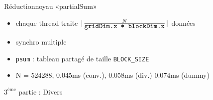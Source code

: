 \documentclass[11pt,mathserif]{beamer}
\begin{document}
\begin{frame}{Réduction}{noyau «partialSum»}
\pause
  
\pause
  \begin{itemize}[<+->]
    \item chaque thread traite $\lfloor \frac{N}{\mbox{{\tt gridDim.x * blockDim.x}}}\rfloor $ données
    \item synchro multiple
    \item {\tt psum} : tableau partagé de taille {\tt BLOCK\_SIZE }
    \item[\faClockO] N = 524288, 0.045ms (conv.), 0.058ms (div.) 0.074ms (dummy)
  \end{itemize}
\end{frame}

\begin{frame}
  \begin{center}
    {\Huge $3^{\mbox{ème}}$ partie : Divers }
  \end{center}
\end{frame}
\end{document}
